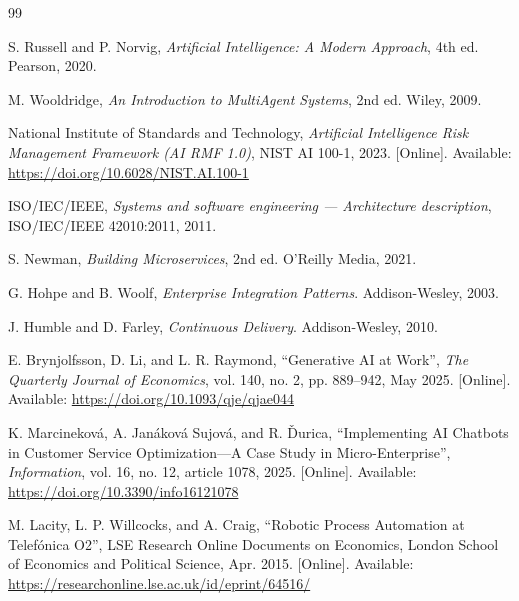 \begin{thebibliography}{99}

S. Russell and P. Norvig, \textit{Artificial Intelligence: A Modern Approach}, 4th ed. Pearson, 2020.

M. Wooldridge, \textit{An Introduction to MultiAgent Systems}, 2nd ed. Wiley, 2009.

National Institute of Standards and Technology, \textit{Artificial Intelligence Risk Management Framework (AI RMF 1.0)}, NIST AI 100-1, 2023. [Online]. Available: \url{https://doi.org/10.6028/NIST.AI.100-1} %

ISO/IEC/IEEE, \textit{Systems and software engineering --- Architecture description}, ISO/\allowbreak{}IEC/\allowbreak{}IEEE 42010:2011, 2011.

S. Newman, \textit{Building Microservices}, 2nd ed. O'Reilly Media, 2021.

G. Hohpe and B. Woolf, \textit{Enterprise Integration Patterns}. Addison-Wesley, 2003.

J. Humble and D. Farley, \textit{Continuous Delivery}. Addison-Wesley, 2010.

E. Brynjolfsson, D. Li, and L. R. Raymond, ``Generative AI at Work'', \textit{The Quarterly Journal of Economics}, vol. 140, no. 2, pp. 889--942, May 2025. [Online]. Available: \url{https://doi.org/10.1093/qje/qjae044}

K. Marcineková, A. Janáková Sujová, and R. Ďurica, ``Implementing AI Chatbots in Customer Service Optimization---A Case Study in Micro-Enterprise'', \textit{Information}, vol. 16, no. 12, article 1078, 2025. [Online]. Available: \url{https://doi.org/10.3390/info16121078}

M. Lacity, L. P. Willcocks, and A. Craig, ``Robotic Process Automation at Telefónica O2'', LSE Research Online Documents on Economics, London School of Economics and Political Science, Apr. 2015. [Online]. Available: \url{https://researchonline.lse.ac.uk/id/eprint/64516/}


\end{thebibliography}
